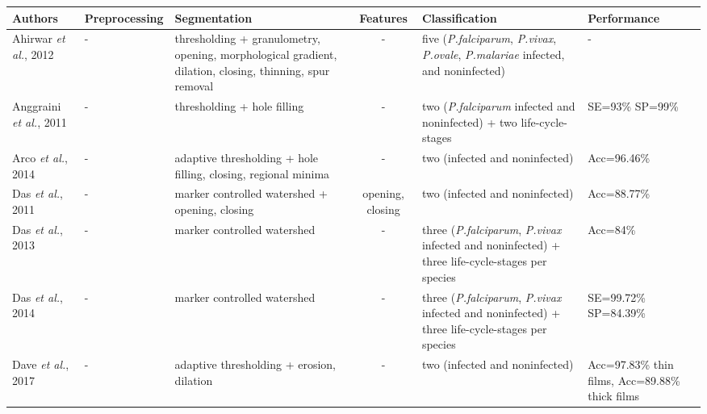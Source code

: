 \footnotesize
{}
\begin{longtable}{C{2.1cm} C{2.4cm} C{2.3cm} H C{2.7cm} C{2.2cm} }
	
	\hline
	\textbf{Authors} & \textbf{Preprocessing} & \textbf{Segmentation} & \textbf{Features} & \textbf{Classification} & \textbf{Performance}  \\[1pt] \hline
	
	Ahirwar \emph{et al.}, 2012  &
	- &
	thresholding + granulometry, opening, morphological gradient, dilation, closing, thinning, spur removal &
	- &
	five (\emph{P.falciparum}, \emph{P.vivax}, \emph{P.ovale}, \emph{P.malariae} infected, and noninfected) &
	- \vspace{0.6cm} \\
	
	Anggraini \emph{et al.}, 2011 &
	- &
	thresholding + hole filling &	
	- &
	two (\emph{P.falciparum} infected and noninfected) + two life-cycle-stages &
	SE=93\% SP=99\%
	\vspace{0.6cm}
	\\
	Arco \emph{et al.}, 2014 &
	- &
	adaptive thresholding + hole filling, closing, regional minima &	
	- &
	two (infected and noninfected) &
	Acc=96.46\%
	\vspace{0.6cm}
	\\
	Das \emph{et al.}, 2011 &
	- &
	marker controlled watershed + opening, closing &	
	opening, closing  &
	two (infected and noninfected) &
	Acc=88.77\%
	\vspace{0.6cm}
	\\
	
	Das \emph{et al.}, 2013 &
	- &
	marker controlled watershed &	
	- &
	three (\emph{P.falciparum}, \emph{P.vivax} infected and noninfected) + three life-cycle-stages per species &
	Acc=84\%
	\vspace{0.6cm}
	\\
	
	Das \emph{et al.}, 2014 &
	- &
	marker controlled watershed &	
	- &
	three (\emph{P.falciparum}, \emph{P.vivax} infected and noninfected) + three life-cycle-stages per species &
	SE=99.72\% SP=84.39\%
	\vspace{0.6cm}
	\\
	
	Dave \emph{et al.}, 2017 &
	- &
	adaptive thresholding + erosion, dilation &	
	- &
	two (infected and noninfected) &
	Acc=97.83\% thin films, Acc=89.88\% thick films
	\vspace{0.6cm}
	\\
	

\end{longtable}
